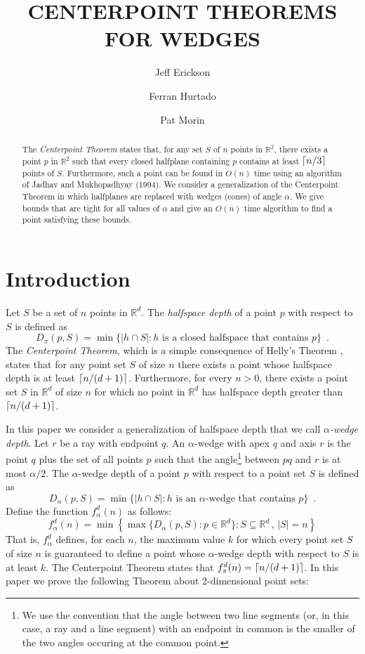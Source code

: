 \documentclass[lotsofwhite]{patmorin}
\title{\MakeUppercase{Centerpoint Theorems for Wedges}}
\author{Jeff Erickson \and
	Ferran Hurtado \and
	Pat Morin}
\date{}
\begin{document}
\maketitle

\begin{abstract}
The \emph{Centerpoint Theorem} states that, for any set $S$ of $n$
points in $\mathbb{R}^2$, there exists a point $p$ in $\mathbb{R}^2$
such that every closed halfplane containing $p$ contains at least
$\left\lceil n/3 \right\rceil$ points of $S$. Furthermore, such a point can be found in
$O(n)$ time using an algorithm of Jadhav and Mukhopadhyay (1994).  We
consider a generalization of the Centerpoint Theorem in which
halfplanes are replaced with wedges (cones) of angle $\alpha$.  We
give bounds that are tight for all values of $\alpha$ and give an
$O(n)$ time algorithm to find a point satisfying these bounds.
\end{abstract}

\section{Introduction}

Let $S$ be a set of $n$ points in $\mathbb{R}^d$.  The \emph{halfspace
depth} \cite{t75} of a point $p$ with respect to $S$ is defined as
\[
D_\pi(p,S) = 
   \min\{|h\cap S| : \mbox{$h$ is a closed halfspace that contains $p$} \}
    \enspace .
\]
The \emph{Centerpoint Theorem}, which is a simple consequence of
Helly's Theorem \cite{e93}, states that for any point set $S$ of size
$n$ there exists a point whose halfspace depth is at least
$\left\lceil n/(d+1) \right\rceil$.  Furthermore, for every $n>0$, there exists a point
set $S$ in $\mathbb{R}^d$ of size $n$ for which no point in
$\mathbb{R}^d$ has halfspace depth greater than $\left\lceil n/(d+1) \right\rceil$. 

In this paper we consider a generalization of halfspace depth that we
call \emph{$\alpha$-wedge depth}. Let $r$ be a ray with endpoint $q$.
An $\alpha$-wedge with apex $q$ and axis $r$ is the point $q$ plus 
the set of all points
$p$ such that the angle\footnote{We use the convention that the angle
between two line segments (or, in this case, a ray and a line segment)
with an endpoint in common is the smaller of the two angles occuring
at the common point.} between $pq$ and $r$ is at most $\alpha/2$.  The
$\alpha$-wedge depth of a point $p$ with respect to a point set $S$ is
defined as
\[
D_\alpha(p,S) =
   \min\{|h\cap S| : \mbox{$h$ is an $\alpha$-wedge that contains $p$} \} 
   \enspace .
\]
Define the function $f^d_\alpha(n)$ as follows:
\[
   f^d_\alpha(n) = \min\left\{\max\{D_\alpha(p,S):p\in
\mathbb{R}^d\}: S\subseteq\mathbb{R}^d\, ,\, |S|=n\right\}
\]
That is, $f^d_\alpha$ defines, for each $n$, the maximum value $k$ for
which every point set $S$ of size $n$ is guaranteed to define a point
whose $\alpha$-wedge depth with respect to $S$ is at least $k$.  The
Centerpoint Theorem states that $f^d_\pi(n) = \left\lceil n/(d+1) \right\rceil$.  In this paper
we prove the following Theorem about 2-dimensional point sets:
\end{document}
